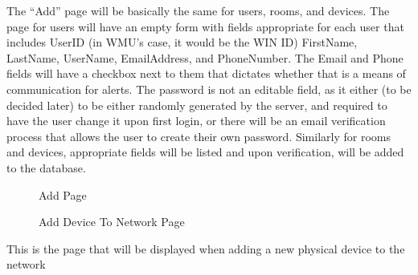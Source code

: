 \documentclass{report}
\begin{document}
The “Add” page will be basically the same for users, rooms, and devices.  The page for users will have an empty form with fields appropriate for each user that includes UserID (in WMU’s case, it would be the WIN ID) FirstName, LastName, UserName, EmailAddress, and PhoneNumber.  The Email and Phone fields will have a checkbox next to them that dictates whether that is a means of communication for alerts.  The password is not an editable field, as it either (to be decided later) to be either randomly generated by the server, and required to have the user change it upon first login, or there will be an email verification process that allows the user to create their own password.  Similarly for rooms and devices, appropriate fields will be listed and upon verification, will be added to the database. 
\begin{figure}[H]
\caption{Add Page}
\end{figure}
\newpage

\begin{figure}[H]
\caption{Add Device To Network Page}
\end{figure}
This is the page that will be displayed when adding a new physical device to the network
\newpage
\end{document}
